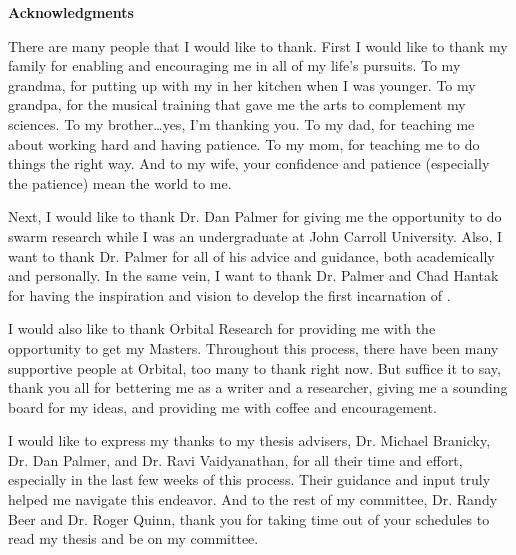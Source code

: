 {\noindent \Huge \textbf{Acknowledgments}}

There are many people that I would like to thank.  First I would like to thank my family for enabling and encouraging me in all of my life's pursuits.  To my grandma, for putting up with my  in her kitchen when I was younger.  To my grandpa, for the musical training that gave me the arts to complement my sciences.  To my brother\ldots yes, I'm thanking you.  To my dad, for teaching me about working hard and having patience.  To my mom, for teaching me to do things the right way.  And to my wife, your confidence and patience (especially the patience) mean the world to me.

Next, I would like to thank Dr. Dan Palmer for giving me the opportunity to do swarm research while I was an undergraduate at John Carroll University.  Also, I want to thank Dr. Palmer for all of his advice and guidance, both academically and personally.  In the same vein, I want to thank Dr. Palmer and Chad Hantak for having the inspiration and vision to develop the first incarnation of \SWEEP.

I would also like to thank Orbital Research for providing me with the opportunity to get my Masters.  Throughout this process, there have been many supportive people at Orbital, too many to thank right now.  But suffice it to say, thank you all for bettering me as a writer and a researcher, giving me a sounding board for my ideas, and providing me with coffee and encouragement.

I would like to express my thanks to my thesis advisers, Dr. Michael Branicky, Dr. Dan Palmer, and Dr. Ravi Vaidyanathan, for all their time and effort, especially in the last few weeks of this process.  Their guidance and input truly helped me navigate this endeavor.  And to the rest of my committee, Dr. Randy Beer and Dr. Roger Quinn, thank you for taking time out of your schedules to read my thesis and be on my committee.

